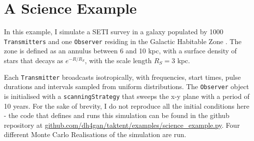 \documentclass[RNAAS]{aastex62}
\begin{document}
\section{A Science Example}

\noindent In this example, I simulate a SETI survey in a galaxy populated by 1000 \texttt{Transmitters} and one \texttt{Observer} residing in the Galactic Habitable Zone \citep{GHZ,Gowanlock2011}.  The zone is defined as an annulus between 6 and 10 kpc, with a surface density of stars that decays as $e^{-R/R_S}$, with the scale length $R_S=3$ kpc. 

Each \texttt{Transmitter} broadcasts isotropically, with frequencies, start times, pulse durations and intervals sampled from uniform distributions.  The \texttt{Observer} object is initialised with a \texttt{scanningStrategy} that sweeps the x-y plane with a period of 10 years.  For the sake of brevity, I do not reproduce all the initial conditions here - the code that defines and runs this simulation can be found in the github repository at \url{github.com/dh4gan/taktent/examples/science\_example.py}.  Four different Monte Carlo Realisations of the simulation are run.
\end{document}
